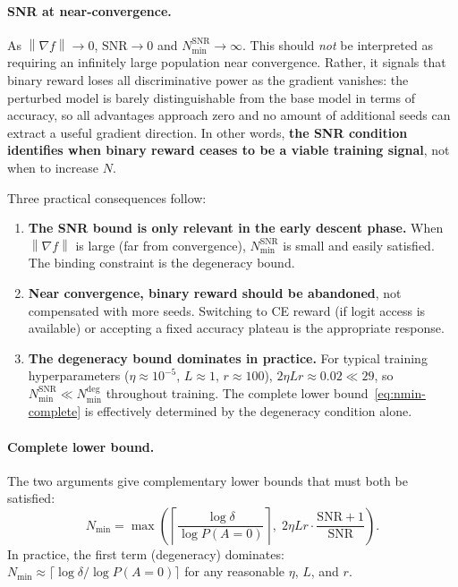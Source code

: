 \documentclass[11pt]{article}
\theoremstyle{definition}
\theoremstyle{remark}
\newcommand{\norm}[1]{\left\|#1\right\|}
\newcommand{\Nmin}{N_{\mathrm{min}}}
\newcommand{\SNR}{\mathrm{SNR}}
\begin{document}
\paragraph{SNR at near-convergence.}
As $\norm{\nabla f} \to 0$, $\SNR \to 0$ and $\Nmin^{\mathrm{SNR}} \to \infty$. This should \emph{not} be interpreted as requiring an infinitely large population near convergence. Rather, it signals that binary reward loses all discriminative power as the gradient vanishes: the perturbed model is barely distinguishable from the base model in terms of accuracy, so all advantages approach zero and no amount of additional seeds can extract a useful gradient direction. In other words, \textbf{the SNR condition identifies when binary reward ceases to be a viable training signal}, not when to increase $N$.

Three practical consequences follow:
\begin{enumerate}[leftmargin=*]
  \item \textbf{The SNR bound is only relevant in the early descent phase.} When $\norm{\nabla f}$ is large (far from convergence), $\Nmin^{\mathrm{SNR}}$ is small and easily satisfied. The binding constraint is the degeneracy bound.
  \item \textbf{Near convergence, binary reward should be abandoned}, not compensated with more seeds. Switching to CE reward (if logit access is available) or accepting a fixed accuracy plateau is the appropriate response.
  \item \textbf{The degeneracy bound dominates in practice.} For typical training hyperparameters ($\eta \approx 10^{-5}$, $L \approx 1$, $r \approx 100$), $2\eta Lr \approx 0.02 \ll 29$, so $\Nmin^{\mathrm{SNR}} \ll \Nmin^{\mathrm{deg}}$ throughout training. The complete lower bound~\eqref{eq:nmin-complete} is effectively determined by the degeneracy condition alone.
\end{enumerate}

\paragraph{Complete lower bound.}
The two arguments give complementary lower bounds that must both be satisfied:
\begin{equation}
  \Nmin = \max\!\left(\left\lceil\frac{\log\delta}{\log P(A=0)}\right\rceil,\; 2\eta Lr\cdot\frac{\SNR+1}{\SNR}\right).
  \label{eq:nmin-complete}
\end{equation}
In practice, the first term (degeneracy) dominates: $\Nmin \approx \lceil \log\delta / \log P(A=0) \rceil$ for any reasonable $\eta$, $L$, and $r$.
\end{document}
